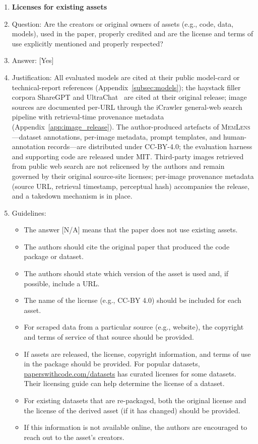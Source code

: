 \documentclass{llmxive}
\providecommand{\bench}{\textsc{MemLens}}
\providecommand{\answerYes}[1][]{[Yes]#1}
\providecommand{\answerNA}[1][]{[N/A]#1}
\begin{document}
\begin{enumerate}
\item {\bf Licenses for existing assets}
    \item[] Question: Are the creators or original owners of assets (e.g., code, data, models), used in the paper, properly credited and are the license and terms of use explicitly mentioned and properly respected?
    \item[] Answer: \answerYes{}
    \item[] Justification: All evaluated models are cited at their public model-card or technical-report references (Appendix~\ref{subsec:models}); the haystack filler corpora ShareGPT and UltraChat~\cite{ding2023enhancing} are cited at their original release; image sources are documented per-URL through the iCrawler general-web search pipeline with retrieval-time provenance metadata (Appendix~\ref{app:image_release}). The author-produced artefacts of \bench{}---dataset annotations, per-image metadata, prompt templates, and human-annotation records---are distributed under CC-BY-4.0; the evaluation harness and supporting code are released under MIT. Third-party images retrieved from public web search are not relicensed by the authors and remain governed by their original source-site licenses; per-image provenance metadata (source URL, retrieval timestamp, perceptual hash) accompanies the release, and a takedown mechanism is in place.
    \item[] Guidelines:
    \begin{itemize}
        \item The answer \answerNA{} means that the paper does not use existing assets.
        \item The authors should cite the original paper that produced the code package or dataset.
        \item The authors should state which version of the asset is used and, if possible, include a URL.
        \item The name of the license (e.g., CC-BY 4.0) should be included for each asset.
        \item For scraped data from a particular source (e.g., website), the copyright and terms of service of that source should be provided.
        \item If assets are released, the license, copyright information, and terms of use in the package should be provided. For popular datasets, \url{paperswithcode.com/datasets} has curated licenses for some datasets. Their licensing guide can help determine the license of a dataset.
        \item For existing datasets that are re-packaged, both the original license and the license of the derived asset (if it has changed) should be provided.
        \item If this information is not available online, the authors are encouraged to reach out to the asset's creators.
    \end{itemize}


\end{enumerate}
\end{document}
